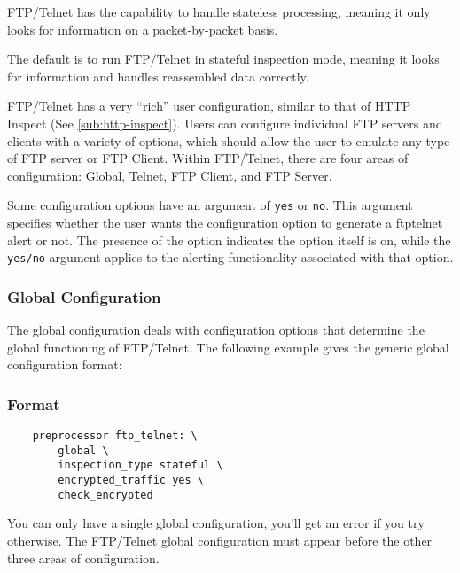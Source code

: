 \documentclass[english]{report}
\newenvironment{note}{
\samepage
    \vspace{10pt}{\textsf{
        {\hspace{7pt}\Huge{$\triangle$\hspace{-12.5pt}{\Large{$^!$}}}}\hspace{5pt}
        {\Large{NOTE}}
    }
    }
   \begin{center}
    \par\vspace{-17pt}

    \begin{lrbox}{\savepar}
    \begin{minipage}[r]{6in}
}
{
    \end{minipage}
    \end{lrbox}
    \fbox{
        \usebox{
            \savepar
	}
    }
    \par\vskip10pt
    \end{center}
}
\newenvironment{note}{
        \begin{rawhtml}
        <p><table border="1"><tr><td><b>
        Note:&nbsp;&nbsp;</b>
        \end{rawhtml}
}{
        \begin{rawhtml}
        </b></td></tr></table></p>
        \end{rawhtml}
}
\begin{document}
FTP/Telnet has the capability to handle stateless processing, meaning it only
looks for information on a packet-by-packet basis.  

The default is to run FTP/Telnet in stateful inspection mode, meaning it looks
for information and handles reassembled data correctly.

FTP/Telnet has a very ``rich'' user configuration, similar to that of HTTP
Inspect (See \ref{sub:http-inspect}).  Users can configure individual FTP
servers and clients with a variety of options, which should allow the user to
emulate any type of FTP server or FTP Client.  Within FTP/Telnet, there are
four areas of configuration: Global, Telnet, FTP Client, and FTP Server.

\begin{note}

Some configuration options have an argument of \texttt{yes} or \texttt{no}.
This argument specifies whether the user wants the configuration option to
generate a ftptelnet alert or not.  The presence of the option indicates the
option itself is on, while the \texttt{yes/no} argument applies to the alerting
functionality associated with that option.

\end{note}

\subsubsection{Global Configuration}

The global configuration deals with configuration options that determine the
global functioning of FTP/Telnet.  The following example gives the generic
global configuration format:

\subsubsection{Format}

\begin{verbatim}
    preprocessor ftp_telnet: \
        global \
        inspection_type stateful \
        encrypted_traffic yes \
        check_encrypted
\end{verbatim}

You can only have a single global configuration, you'll get an error if you try
otherwise.  The FTP/Telnet global configuration must appear before the other
three areas of configuration.
\end{document}
